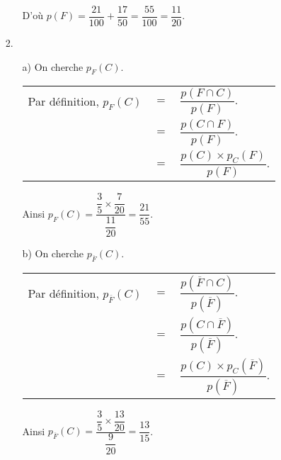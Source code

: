 \begin{itemize}
\begin{itemize}
D'où $p\left(F\right) = \dfrac{21}{100} + \dfrac{17}{50}  = \dfrac{55}{100} = \dfrac{11}{20}$. \\

\end{itemize}
\item[2.] 
\begin{itemize}
\item[a)] On cherche $p_F\left(C\right)$. \\

\begin{tabular}{lll}
\hspace*{-.3cm} Par définition, $p_F\left(C\right)$ & $=$ & $\dfrac{p\left(F \cap C\right)}{p\left(F\right)}$. \vspace*{.3cm} \\
& $=$ & $\dfrac{p\left(C\cap F\right)}{p\left(F\right)}$. \vspace*{.3cm} \\
& $=$ & $\dfrac{p\left(C\right) \times p_C\left(F\right)}{p\left(F\right)}$. 
\end{tabular}

\vspace*{.3cm}

Ainsi $p_F\left(C\right) = \dfrac{\dfrac{3}{5} \times \dfrac{7}{20}}{\dfrac{11}{20}} = \dfrac{21}{55}$. \\

\item[b)] On cherche $p_{\overline{F}}\left(C\right)$. \\

\begin{tabular}{lll}
\hspace*{-.3cm} Par définition, $p_{\overline{F}}\left(C\right)$ & $=$ & $\dfrac{p\left(\overline{F} \cap C\right)}{p\left(\overline{F}\right)}$. \vspace*{.3cm} \\
& $=$ & $\dfrac{p\left(C\cap \overline{F} \right)}{p\left(\overline{F}\right)}$. \vspace*{.3cm} \\
& $=$ & $\dfrac{p\left(C\right) \times p_C\left(\overline{F}\right)}{p\left(\overline{F}\right)}$. 
\end{tabular}

\vspace*{.3cm}

Ainsi $p_{\overline{F}}\left(C\right) = \dfrac{\dfrac{3}{5} \times \dfrac{13}{20}}{\dfrac{9}{20}} = \dfrac{13}{15}$. \\
\end{itemize}
\end{itemize}

